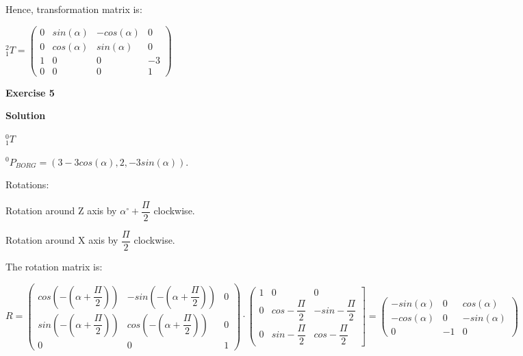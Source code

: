 \documentclass[12pt]{article}
\begin{document}
\begin{list}{)~}{}
Hence, transformation matrix is:

$_{1}^{2}T = \left(\begin{array}{cccc}
0 & sin\left(\alpha\right)& -cos\left(\alpha\right) & 0\\
0 & cos\left(\alpha\right) & sin\left(\alpha\right) & 0\\
1 & 0 & 0 & -3 \\
0 & 0 & 0 & 1\end{array}\right)$

\end{list}

\newpage
\textbf{Exercise 5}		
		
\textbf{Solution}

\begin{list}{)~}{}
\item
$_{1}^{0}T$

$^0 P_{BORG} = \left(3-3cos\left(\alpha\right), 2, -3sin\left(\alpha\right)\right)$.

Rotations:

\begin{list}{)~}{}
\item Rotation around Z axis by $\alpha^\circ + \dfrac{\Pi}{2}$ clockwise.
\item Rotation around X axis by $\dfrac{\Pi}{2}$ clockwise.
\end{list}

The rotation matrix is:

$R=\left(\begin{array}{ccc}
cos\left(-\left(\alpha+\dfrac{\Pi}{2}\right)\right) & -sin\left(-\left(\alpha+\dfrac{\Pi}{2}\right)\right) & 0 \\
sin\left(-\left(\alpha+\dfrac{\Pi}{2}\right)\right) & cos\left(-\left(\alpha+\dfrac{\Pi}{2}\right)\right) & 0\\
0 & 0 & 1\end{array}\right)\cdot 
\left(\begin{array}{ccc}
1 & 0 & 0\\
0 & cos -\dfrac{\Pi}{2} & -sin -\dfrac{\Pi}{2} \\
0 & sin -\dfrac{\Pi}{2} & cos -\dfrac{\Pi}{2} \end{array}\right] = 
\left(\begin{array}{ccc}
-sin\left(\alpha\right) & 0 & cos\left(\alpha\right)\\
- cos\left(\alpha\right) & 0 & -sin\left(\alpha\right)\\
0 & -1 & 0\end{array}\right)$


\end{list}
\end{document}

